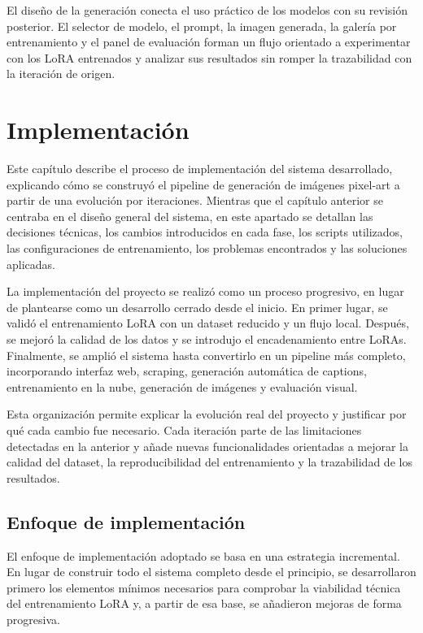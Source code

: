 \documentclass[a4paper,11pt,titlepage]{scrbook}
\begin{document}
\medskip

El diseño de la generación conecta el uso práctico de los modelos con su revisión posterior. El selector de modelo, el prompt, la imagen generada, la galería por entrenamiento y el panel de evaluación forman un flujo orientado a experimentar con los LoRA entrenados y analizar sus resultados sin romper la trazabilidad con la iteración de origen.

\chapter{Implementación} \label{implementacion}

Este capítulo describe el proceso de implementación del sistema desarrollado, explicando cómo se construyó el pipeline de generación de imágenes pixel-art a partir de una evolución por iteraciones. Mientras que el capítulo anterior se centraba en el diseño general del sistema, en este apartado se detallan las decisiones técnicas, los cambios introducidos en cada fase, los scripts utilizados, las configuraciones de entrenamiento, los problemas encontrados y las soluciones aplicadas.

\medskip

La implementación del proyecto se realizó como un proceso progresivo, en lugar de plantearse como un desarrollo cerrado desde el inicio. En primer lugar, se validó el entrenamiento LoRA con un dataset reducido y un flujo local. Después, se mejoró la calidad de los datos y se introdujo el encadenamiento entre LoRAs. Finalmente, se amplió el sistema hasta convertirlo en un pipeline más completo, incorporando interfaz web, scraping, generación automática de captions, entrenamiento en la nube, generación de imágenes y evaluación visual.

\medskip

Esta organización permite explicar la evolución real del proyecto y justificar por qué cada cambio fue necesario. Cada iteración parte de las limitaciones detectadas en la anterior y añade nuevas funcionalidades orientadas a mejorar la calidad del dataset, la reproducibilidad del entrenamiento y la trazabilidad de los resultados.

\section{Enfoque de implementación}

El enfoque de implementación adoptado se basa en una estrategia incremental. En lugar de construir todo el sistema completo desde el principio, se desarrollaron primero los elementos mínimos necesarios para comprobar la viabilidad técnica del entrenamiento LoRA y, a partir de esa base, se añadieron mejoras de forma progresiva.
\end{document}
